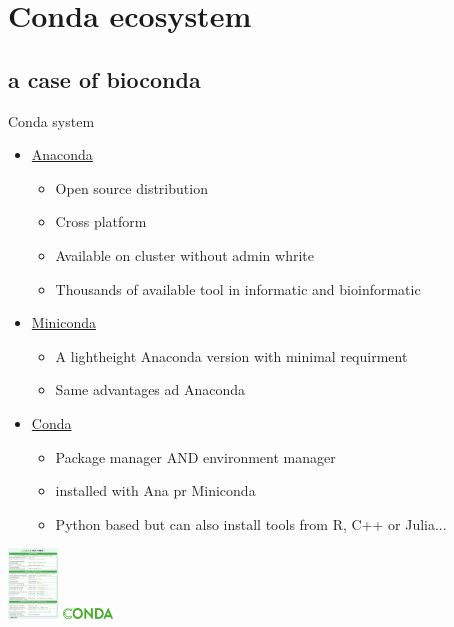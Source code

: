 \section{Conda ecosystem}
\subsection{a case of bioconda}

\begin{frame}{Conda system}
\begin{itemize}
\item \hyperlink{https://www.anaconda.com/}{Anaconda}
	\begin{itemize}
	\item Open source distribution
    \item Cross platform
    \item Available on cluster without admin whrite
    \item Thousands of available tool in informatic and bioinformatic
	\end{itemize}
\item \hyperlink{https://docs.conda.io/en/latest/miniconda.html}{Miniconda}
	\begin{itemize}
	\item A lightheight Anaconda version with minimal requirment
	\item Same advantages ad Anaconda
	\end{itemize}
\item \hyperlink{https://docs.conda.io/projects/conda/en/latest/index.html}{Conda}
	\begin{itemize}
	\item Package manager AND environment manager
	\item installed with Ana pr Miniconda
	\item Python based but can also install tools from R, C++ or Julia...
	\end{itemize}
\end{itemize}
\includegraphics[width=0.1\textwidth]{images/conda_sheet_4.12.pdf} 
\includegraphics[width=0.1\textwidth]{images/conda_logo.pdf} 
\end{frame}

